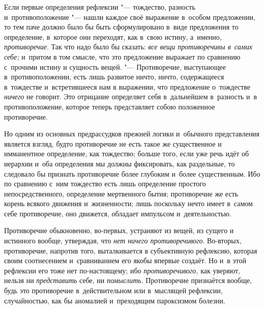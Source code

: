 
Если первые определения рефлексии "--- тождество, разность и~противоположение
"--- нашли каждое своё выражение в~особом предложении, то тем паче должно было
бы быть сформулировано в~виде предложения то определение, в~которое они
переходят, как в~свою истину, а~именно,
{\em противоречие}. Так что надо было бы сказать:
{\em все вещи противоречивы в~самих себе;} и~притом в
том смысле, что это предложение выражает по сравнению с~прочими истину и
сущность вещей. "--- Противоречие, выступающее в~противоположении, есть лишь
развитое ничто, ничто, содержащееся в~тождестве и~встретившееся нам в
выражении, что предложение о~тождестве {\em ничего} не
говорит. Это отрицание определяет себя в~дальнейшем в~разность и~в
противоположение, которое теперь представляет собою положенное противоречие.

Но одним из основных предрассудков прежней логики и~обычного представления
является взгляд, будто противоречие не есть такое же существенное и
имманентное определение, как тождество; больше того, если уже речь идёт об
иерархии и~оба определения мы должны фиксировать, как раздельные, то
следовало бы признать противоречие более глубоким и~более существенным. Ибо
по сравнению с~ним тождество есть лишь определение простого
непосредственного, определение мертвенного бытия; противоречие же есть
корень всякого движения и~жизненности; лишь поскольку нечто имеет в~самом
себе противоречие, оно движется, обладает импульсом и~деятельностью.

Противоречие обыкновенно, во-первых, устраняют из вещей, из сущего и
истинного вообще, утверждая, что {\em нет ничего
противоречивого}. Во-вторых, противоречие, напротив того, выталкивается в
субъективную рефлексию, которая своим соотнесением и~сравниванием его якобы
впервые создаёт. Но и~в этой рефлексии его тоже нет по-настоящему; ибо
{\em противоречивого,} как уверяют, нельзя ни {\em представить} себе, ни
{\em помыслить}. Противоречие признаётся вообще, будь
это противоречие в~действительном или в~мыслящей рефлексии, случайностью,
как бы аномалией и~преходящим пароксизмом болезни.

